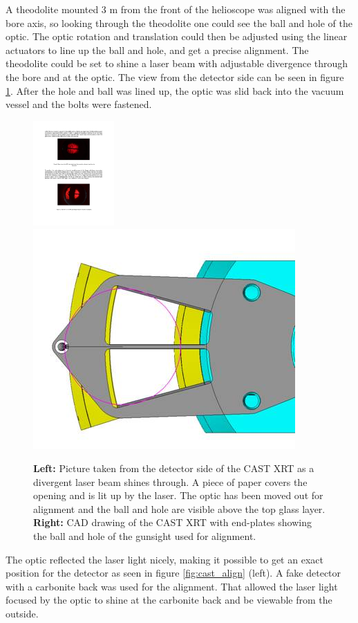 A theodolite mounted 3 m from the front of the helioscope was aligned with the bore axis, so looking through the theodolite one could see the ball and hole of the optic. The optic rotation and translation could then be adjusted using the linear actuators to line up the ball and hole, and get a precise alignment. The theodolite could be set to shine a laser beam with adjustable divergence through the bore and at the optic. The view from the detector side can be seen in figure \ref{fig:ball_and_hole}. After the hole and ball was lined up, the optic was slid back into the vacuum vessel and the bolts were fastened.

\begin{figure}[htbp]
  \centering
    \includegraphics[height=4cm,trim=40 10 60 0, clip]{figures/cast/ballandhole.pdf}
    \includegraphics[width=0.47\linewidth]{figures/cast/ballandhole.jpg}
  \caption{\footnotesize \textbf{Left:} Picture taken from the detector side of the CAST XRT as a divergent laser beam shines through. A piece of paper covers the opening and is lit up by the laser. The optic has been moved out for alignment and the ball and hole are visible above the top glass layer. \textbf{Right:} CAD drawing of the CAST XRT with end-plates showing the ball and hole of the gunsight used for alignment. }
  \label{fig:ball_and_hole}
\end{figure}

The optic reflected the laser light nicely, making it possible to get an exact position for the detector as seen in figure \ref{fig:cast_align} (left). A fake detector with a carbonite back was used for the alignment. That allowed the laser light focused by the optic to shine at the carbonite back and be viewable from the outside.

